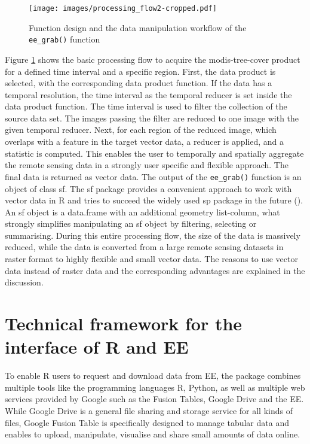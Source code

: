 \begin{center}
	\begin{figure}[h]
		\begin{center}
			\texttt{[image: images/processing\_flow2-cropped.pdf]}
			\caption{Function design and the data manipulation workflow of the \texttt{ee\_grab()} function}
			\label{Workflow}
		\end{center}
	\end{figure}
\end{center}

Figure \ref{Workflow} shows the basic processing flow to acquire the modis-tree-cover product for a defined time interval and a specific region. First, the data product is selected, with the corresponding data product function. If the data has a temporal resolution, the time interval as the temporal reducer is set inside the data product function. The time interval is used to filter the collection of the source data set. The images passing the filter are reduced to one image with the given temporal reducer. Next, for each region of the reduced image, which overlaps with a feature in the target vector data, a reducer is applied, and a statistic is computed. This enables the user to temporally and spatially aggregate the remote sensing data in a strongly user specific and flexible approach. The final data is returned as vector data.
The output of the \texttt{ee\_grab()} function is an object of class sf. The sf package provides a convenient approach to work with vector data in R and tries to succeed the widely used sp package in the future (\cite{sf}). An sf object is a data.frame with an additional geometry list-column, what strongly simplifies manipulating an sf object by filtering, selecting or summarising. 
During this entire processing flow, the size of the data is massively reduced, while the data is converted from a large remote sensing datasets in raster format to highly flexible and small vector data. The reasons to use vector data instead of raster data and the corresponding advantages are explained in the discussion.


\section{Technical framework for the interface of R and EE}

To enable R users to request and download data from EE, the package combines multiple tools like the programming languages R, Python, as well as multiple web services provided by Google such as the Fusion Tables, Google Drive and the EE. While Google Drive is a general file sharing and storage service for all kinds of files, Google Fusion Table is specifically designed to manage tabular data and enables to upload, manipulate, visualise and share small amounts of data online.

